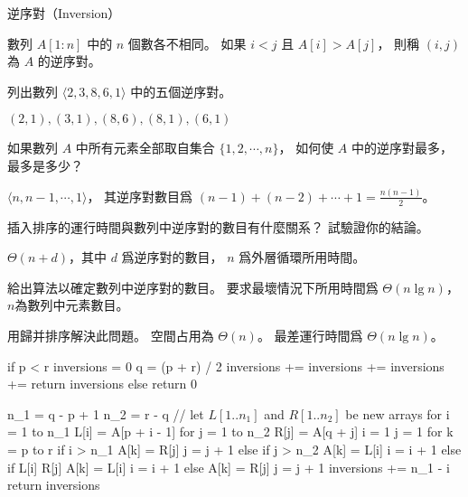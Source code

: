 逆序對（Inversion）

數列 $A[1:n]$ 中的 $n$ 個數各不相同。
如果 $i<j$ 且 $A[i]>A[j]$，
則稱 $(i,j)$ 為 $A$ 的逆序對。
\startigBase[a]
\item 列出數列 $\langle 2,3,8,6,1\rangle$ 中的五個逆序對。

\startANSWER
$(2,1),(3,1),(8,6),(8,1),(6,1)$
\stopANSWER

\item 如果數列 $A$ 中所有元素全部取自集合 $\{1,2,\cdots,n\}$，
如何使 $A$ 中的逆序對最多，最多是多少？

\startANSWER
$\langle n, n-1, \cdots, 1\rangle$，
其逆序對數目爲 $(n-1)+(n-2)+\cdots+1=\frac{n(n-1)}{2}$。
\stopANSWER

\item 插入排序的運行時間與數列中逆序對的數目有什麼關系？
試驗證你的結論。

\startANSWER
$\Theta(n+d)$，其中 $d$ 爲逆序對的數目，
$n$ 爲外層循環所用時間。
\stopANSWER

\item 給出算法以確定數列中逆序對的數目。
要求最壞情況下所用時間爲 $\Theta(n\lg n)$，
$n$為數列中元素數目。

\startANSWER
用歸并排序解決此問題。
空間占用為 $\Theta(n)$。
最差運行時間爲 $\Theta(n\lg n)$。

\startCLRSCODE
if p < r
	inversions = 0
	q = (p + r) / 2
	inversions += 
	inversions += 
	inversions += 
	return inversions
else
	return 0
\stopCLRSCODE

\startCLRSCODE
n_1 = q - p + 1
n_2 = r - q
// let $L[1..n_1]$ and $R[1..n_2]$ be new arrays
for i = 1 to n_1
	L[i] = A[p + i - 1]
for j = 1 to n_2
	R[j] = A[q + j]
i = 1
j = 1
for k = p to r
	if i > n_1
		A[k] = R[j]
		j = j + 1
	else if j > n_2
		A[k] = L[i]
		i = i + 1
	else if L[i] \le R[j]
		A[k] = L[i]
		i = i + 1
	else
		A[k] = R[j]
		j = j + 1
		inversions += n_1 - i
return inversions
\stopCLRSCODE
\stopANSWER

\stopigBase
\stopPROBLEM

